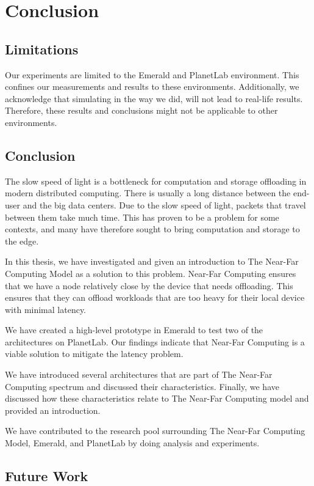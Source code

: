 \chapter{Conclusion}

\section{Limitations}
Our experiments are limited to the Emerald and PlanetLab environment. This confines our measurements and results to these environments. Additionally, we acknowledge that simulating in the way we did, will not lead to real-life results. Therefore, these results and conclusions might not be applicable to other environments.


\section{Conclusion}
The slow speed of light is a bottleneck for computation and storage offloading in modern distributed computing. There is usually a long distance between the end-user and the big data centers. Due to the slow speed of light, packets that travel between them take much time. This has proven to be a problem for some contexts, and many have therefore sought to bring computation and storage to the edge. 

In this thesis, we have investigated and given an introduction to The Near-Far Computing Model as a solution to this problem. Near-Far Computing ensures that we have a node relatively close by the device that needs offloading. This ensures that they can offload workloads that are too heavy for their local device with minimal latency. 

We have created a high-level prototype in Emerald to test two of the architectures on PlanetLab. Our findings indicate that Near-Far Computing is a viable solution to mitigate the latency problem. 

We have introduced several architectures that are part of The Near-Far Computing spectrum and discussed their characteristics. Finally, we have discussed how these characteristics relate to The Near-Far Computing model and provided an introduction.

We have contributed to the research pool surrounding The Near-Far Computing Model, Emerald, and PlanetLab by doing analysis and experiments.



\section{Future Work}

